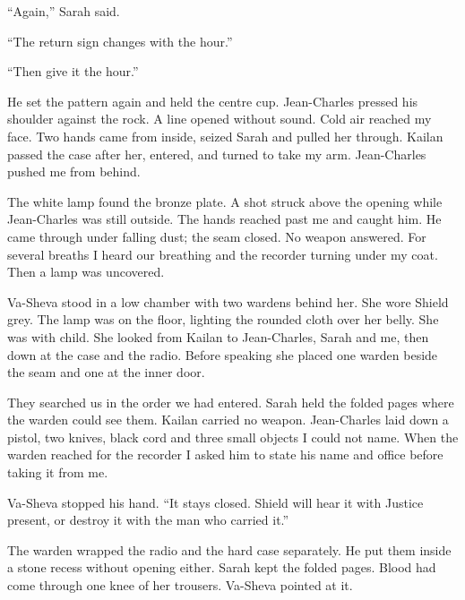 ``Again,'' Sarah said.\par

``The return sign changes with the hour.''\par

``Then give it the hour.''\par

He set the pattern again and held the centre cup. Jean-Charles pressed his shoulder against the rock. A line opened without sound. Cold air reached my face. Two hands came from inside, seized Sarah and pulled her through. Kailan passed the case after her, entered, and turned to take my arm. Jean-Charles pushed me from behind.\par

The white lamp found the bronze plate. A shot struck above the opening while Jean-Charles was still outside. The hands reached past me and caught him. He came through under falling dust; the seam closed. No weapon answered. For several breaths I heard our breathing and the recorder turning under my coat. Then a lamp was uncovered.\par

\ornament

Va-Sheva stood in a low chamber with two wardens behind her. She wore Shield grey. The lamp was on the floor, lighting the rounded cloth over her belly. She was with child. She looked from Kailan to Jean-Charles, Sarah and me, then down at the case and the radio. Before speaking she placed one warden beside the seam and one at the inner door.\par

They searched us in the order we had entered. Sarah held the folded pages where the warden could see them. Kailan carried no weapon. Jean-Charles laid down a pistol, two knives, black cord and three small objects I could not name. When the warden reached for the recorder I asked him to state his name and office before taking it from me.\par

Va-Sheva stopped his hand. ``It stays closed. Shield will hear it with Justice present, or destroy it with the man who carried it.''\par

The warden wrapped the radio and the hard case separately. He put them inside a stone recess without opening either. Sarah kept the folded pages. Blood had come through one knee of her trousers. Va-Sheva pointed at it.\par

